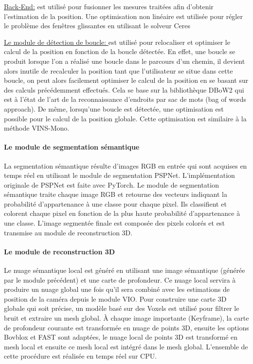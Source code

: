 \documentclass[11pt]{article}
\begin{document}
  \underline{Back-End:} est utilisé pour fusionner les mesures traitées afin d'obtenir l'estimation de la position. Une optimisation non linéaire
  est utilisée pour régler le problème des fenêtres glissantes en utilisant le solveur Ceres

  \underline{Le module de détection de boucle: } est utilisé pour relocaliser et optimiser le calcul de la position en fonction de
  la boucle détectée. En effet, une boucle se produit lorsque l'on a réalisé une boucle dans le parcours d'un chemin, il devient alors inutile
  de recalculer la position tant que l'utilisateur se situe dans cette boucle, on peut alors facilement optimiser le calcul de la position en se 
  basant sur des calculs précédemment effectués. Cela se base sur la bibliothèque DBoW2 qui est à l'état de l'art de la reconnaissance d'endroits 
  par sac de mots (bag of words approach). De même, lorsqu'une boucle est détectée, une optimisation est possible pour le calcul de la position 
  globale. Cette optimisation est similaire à la méthode VINS-Mono.

  \paragraph{Le module de segmentation sémantique}
  La segmentation sémantique résulte d'images RGB en entrée qui sont acquises en temps réel en utilisant le module de segmentation PSPNet.
  L'implémentation originale de PSPNet est faite avec PyTorch.
  Le module de segmentation sémantique traite chaque image RGB et retourne des vecteurs indiquant la probabilité d'appartenance à une classe
  pour chaque pixel. Ils classifient et colorent chaque pixel en fonction de la plus haute probabilité d'appartenance à une classe. 
  L'image segmentée finale est composée des pixels colorés et est transmise au module de reconstruction 3D.

  \paragraph{Le module de reconstruction 3D}

  Le nuage sémantique local est généré en utilisant une image sémantique (générée par le module précédent) et une carte de profondeur. 
  Ce nuage local servira à produire un nuage global une fois qu'il sera combiné avec les estimations de position de la caméra depuis le module VIO.
  Pour construire une carte 3D globale qui soit précise, un modèle basé sur des Voxels est utilisé pour filtrer le bruit et extraire un mesh global.
  À chaque image importante (Keyframe), la carte de profondeur courante est transformée en nuage de points 3D, ensuite les options Bovblox et FAST
  sont adaptées, le nuage local de points 3D est transformé en mesh local et ensuite ce mesh local est intégré dans le mesh global. L'ensemble de 
  cette procédure est réalisée en temps réel sur CPU.
\end{document}
